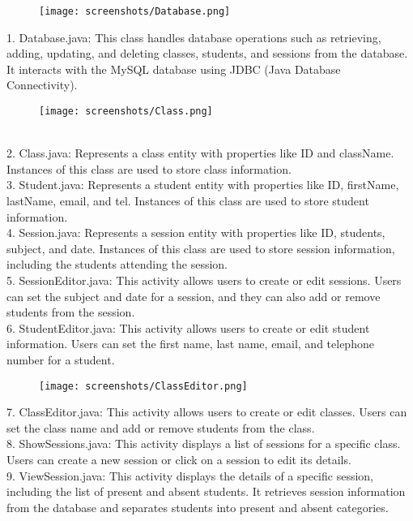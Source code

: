 \documentclass[10pt,twocolumn]{article}
\begin{document}
\begin{figure}[h]
\texttt{[image: screenshots/Database.png]}
\centering
\end{figure} 
1. Database.java: This class handles database operations such as retrieving, adding, updating, and deleting classes, students, and sessions from the database. It interacts with the MySQL database using JDBC (Java Database Connectivity).\\
\begin{figure}[h]
\texttt{[image: screenshots/Class.png]}
\centering
\end{figure} \\
2. Class.java: Represents a class entity with properties like ID and className. Instances of this class are used to store class information.\\
3. Student.java: Represents a student entity with properties like ID, firstName, lastName, email, and tel. Instances of this class are used to store student information.\\
4. Session.java: Represents a session entity with properties like ID, students, subject, and date. Instances of this class are used to store session information, including the students attending the session.\\
5. SessionEditor.java: This activity allows users to create or edit sessions. Users can set the subject and date for a session, and they can also add or remove students from the session.\\
6. StudentEditor.java: This activity allows users to create or edit student information. Users can set the first name, last name, email, and telephone number for a student.\\
\begin{figure}[ht]
\texttt{[image: screenshots/ClassEditor.png]}
\centering
\end{figure}
7. ClassEditor.java: This activity allows users to create or edit classes. Users can set the class name and add or remove students from the class.\\
8. ShowSessions.java: This activity displays a list of sessions for a specific class. Users can create a new session or click on a session to edit its details.\\
9. ViewSession.java: This activity displays the details of a specific session, including the list of present and absent students. It retrieves session information from the database and separates students into present and absent categories.\\
\end{document}
